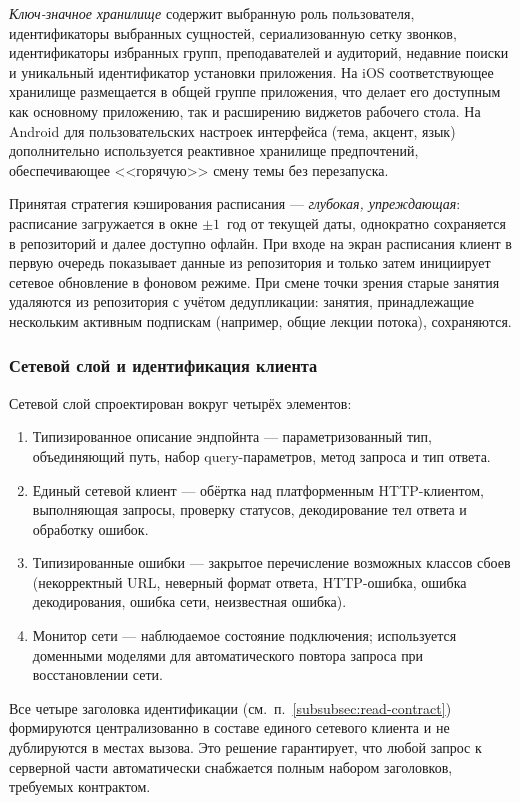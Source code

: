 \emph{Ключ-значное хранилище} содержит выбранную роль пользователя, идентификаторы выбранных сущностей, сериализованную сетку звонков, идентификаторы избранных групп, преподавателей и аудиторий, недавние поиски и уникальный идентификатор установки приложения. На iOS соответствующее хранилище размещается в общей группе приложения, что делает его доступным как основному приложению, так и расширению виджетов рабочего стола. На Android для пользовательских настроек интерфейса (тема, акцент, язык) дополнительно используется реактивное хранилище предпочтений, обеспечивающее <<горячую>> смену темы без перезапуска.

Принятая стратегия кэширования расписания --- \emph{глубокая, упреждающая}: расписание загружается в окне $\pm 1$~год от текущей даты, однократно сохраняется в репозиторий и далее доступно офлайн. При входе на экран расписания клиент в первую очередь показывает данные из репозитория и только затем инициирует сетевое обновление в фоновом режиме. При смене точки зрения старые занятия удаляются из репозитория с учётом дедупликации: занятия, принадлежащие нескольким активным подпискам (например, общие лекции потока), сохраняются.

\subsubsection{Сетевой слой и идентификация клиента}
\label{subsubsec:network-layer}

Сетевой слой спроектирован вокруг четырёх элементов:

\begin{enumerate}
  \item Типизированное описание эндпойнта --- параметризованный тип, объединяющий путь, набор query-параметров, метод запроса и тип ответа.
  \item Единый сетевой клиент --- обёртка над платформенным HTTP-клиентом, выполняющая запросы, проверку статусов, декодирование тел ответа и обработку ошибок.
  \item Типизированные ошибки --- закрытое перечисление возможных классов сбоев (некорректный URL, неверный формат ответа, HTTP-ошибка, ошибка декодирования, ошибка сети, неизвестная ошибка).
  \item Монитор сети --- наблюдаемое состояние подключения; используется доменными моделями для автоматического повтора запроса при восстановлении сети.
\end{enumerate}

Все четыре заголовка идентификации (см.~п.~\ref{subsubsec:read-contract}) формируются централизованно в составе единого сетевого клиента и не дублируются в местах вызова. Это решение гарантирует, что любой запрос к серверной части автоматически снабжается полным набором заголовков, требуемых контрактом.

